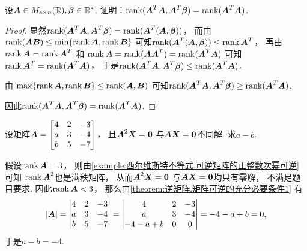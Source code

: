 \begin{example}
设\(
	\boldsymbol{A} \in M_{s \times n}(\mathbb{R}),
	\boldsymbol\beta \in \mathbb{R}^s
\).
证明：\(
	\rank(\boldsymbol{A}^T \boldsymbol{A}, \boldsymbol{A}^T \boldsymbol\beta)
	= \rank(\boldsymbol{A}^T \boldsymbol{A})
\).
\begin{proof}
显然\(
	\rank(\boldsymbol{A}^T \boldsymbol{A}, \boldsymbol{A}^T \boldsymbol\beta)
	= \rank(\boldsymbol{A}^T (\boldsymbol{A}, \boldsymbol\beta))
\)，
而由 \hyperref[theorem:线性方程组.矩阵乘积的秩]{$\rank(\boldsymbol{A}\boldsymbol{B}) \leq \min\{\rank\boldsymbol{A},\rank\boldsymbol{B}\}$} 可知\(
	\rank(\boldsymbol{A}^T (\boldsymbol{A}, \boldsymbol\beta))
	\leq \rank\boldsymbol{A}^T
\)，
再由 \hyperref[theorem:向量空间.转置不变秩]{$\rank\boldsymbol{A} = \rank\boldsymbol{A}^T$}
和 \hyperref[equation:矩阵乘积的秩.实矩阵及其转置矩阵的乘积的秩]{$\rank\boldsymbol{A} = \rank(\boldsymbol{A} \boldsymbol{A}^T) = \rank(\boldsymbol{A}^T \boldsymbol{A})$}
可知\(
	\rank\boldsymbol{A}^T
	= \rank(\boldsymbol{A}^T \boldsymbol{A})
\)，
于是\(
	\rank(\boldsymbol{A}^T \boldsymbol{A}, \boldsymbol{A}^T \boldsymbol\beta)
	\leq \rank(\boldsymbol{A}^T \boldsymbol{A})
\).

由 \hyperref[example:矩阵乘积的秩.分块矩阵的秩的等式2]{$\max\{\rank\boldsymbol{A},\rank\boldsymbol{B}\} \leq \rank(\boldsymbol{A},\boldsymbol{B})$} 可知\(
	\rank(\boldsymbol{A}^T \boldsymbol{A}, \boldsymbol{A}^T \boldsymbol\beta)
	\geq \rank(\boldsymbol{A}^T \boldsymbol{A})
\).

因此\(
	\rank(\boldsymbol{A}^T \boldsymbol{A}, \boldsymbol{A}^T \boldsymbol\beta)
	= \rank(\boldsymbol{A}^T \boldsymbol{A})
\).
\end{proof}
\end{example}

\begin{example}
设矩阵\(\boldsymbol{A} = \begin{bmatrix}
	4 & 2 & -3 \\
	a & 3 & -4 \\
	b & 5 & -7
\end{bmatrix}\)，
且\(\boldsymbol{A}^2 \boldsymbol{X} = \boldsymbol0\)
与\(\boldsymbol{A} \boldsymbol{X} = \boldsymbol0\)不同解.
求\(a-b\).
\begin{solution}
假设\(\rank\boldsymbol{A} = 3\)，
则由\cref{example:西尔维斯特不等式.可逆矩阵的正整数次幂可逆} 可知
\(\rank\boldsymbol{A}^2\)也是满秩矩阵，
从而\(\boldsymbol{A}^2 \boldsymbol{X} = \boldsymbol0\)
与\(\boldsymbol{A} \boldsymbol{X} = \boldsymbol0\)均只有零解，
不满足题目要求.
因此\(\rank\boldsymbol{A} < 3\)，
那么由\cref{theorem:逆矩阵.矩阵可逆的充分必要条件1} 有\begin{equation*}
	\abs{\boldsymbol{A}}
	= \begin{vmatrix}
		4 & 2 & -3 \\
		a & 3 & -4 \\
		b & 5 & -7
	\end{vmatrix}
	= \begin{vmatrix}
		4 & 2 & -3 \\
		a & 3 & -4 \\
		-4-a+b & 0 & 0
	\end{vmatrix}
	= -4 - a + b
	= 0,
\end{equation*}
于是\(a-b=-4\).
\end{solution}
\end{example}
